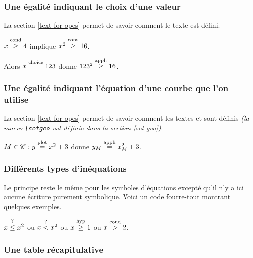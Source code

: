 \documentclass[12pt,a4paper]{article}
\theoremstyle{definition}
\begin{document}
\subsubsection{Une égalité indiquant le choix d'une valeur}

La section \ref{text-for-opes} permet de savoir comment le texte \emph{\og \textopchoice \fg} est défini.

\begin{latexex}
$x \geqcond 4$ implique
$x^2 \geqcons 16$.

Alors $x \eqchoice 123$ donne
$123^2 \geqappli 16$.
\end{latexex}




\subsubsection{Une égalité indiquant l'équation d'une courbe que l'on utilise}

La section \ref{text-for-opes} permet de savoir comment les textes \emph{\og \textopplot \fg} et \emph{\og \textopappli \fg} sont définis \emph{(la macro \emph{\texttt{\textbackslash{}setgeo}} est définie dans la section \ref{set-geo})}.

\begin{latexex}
$M \in \setgeo{C}: y \eqplot x^2 + 3$
donne
$y_M \eqappli x_M^2 + 3$.
\end{latexex}




\subsubsection{Différents types d'inéquations}

Le principe reste le même pour les symboles d'équations excepté qu'il n'y a ici aucune écriture purement symbolique. Voici un code \og fourre-tout \fg{} montrant quelques exemples.

\begin{latexex}
$x \leqtest x^2$ ou $x \ltest x^2$ ou
$x \geqhyp 1$ ou $x \gcond 2$.
\end{latexex}




\subsubsection{Une table récapitulative}
\end{document}
